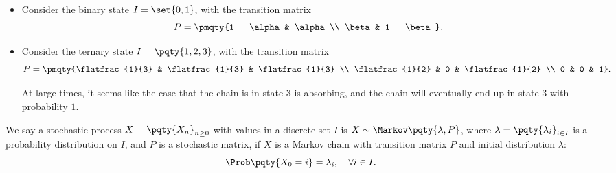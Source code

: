 \begin{examples}
    \begin{itemize}
        \item Consider the binary state \(I = \set{0, 1}\), with the transition matrix
        \[
            P = \pmqty{1 - \alpha & \alpha \\ \beta & 1 - \beta}.
        \]

        \item Consider the ternary state \(I = \pqty{1, 2, 3}\), with the transition matrix
        \[
            P = \pmqty{\flatfrac{1}{3} & \flatfrac{1}{3} & \flatfrac{1}{3} \\ \flatfrac{1}{2} & 0 & \flatfrac{1}{2} \\ 0 & 0 & 1}.
        \]

        At large times, it seems like the case that the chain is in state \(3\) is absorbing, and the chain will eventually end up in state \(3\) with probability \(1\).
    \end{itemize}
\end{examples}

\begin{definition}
    We say a stochastic process \(X = \pqty{X_n}_{n \geq 0}\) with values in a discrete set \(I\) is \(X \sim \Markov\pqty{\lambda, P}\), where \(\lambda = \pqty{\lambda_i}_{i \in I}\) is a probability distribution on \(I\), and \(P\) is a stochastic matrix, if \(X\) is a Markov chain with transition matrix \(P\) and initial distribution \(\lambda\):
    \[
        \Prob\pqty{X_0 = i} = \lambda_i, \quad \forall i \in I.
    \]
\end{definition}